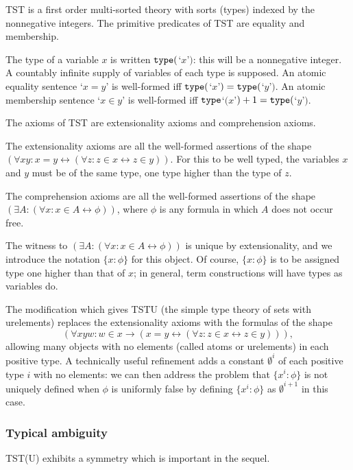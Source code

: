 \documentclass[112pt]{article}
\begin{document}
TST is a first order multi-sorted theory with sorts (types) indexed by the nonnegative integers.  The primitive predicates of TST are equality and membership.

The type of a variable $x$ is written ${\tt type}($`$x$'$)$:  this will be a nonnegative integer.   A countably infinite supply of variables of each type is supposed.  An atomic equality sentence `$x=y$' is well-formed iff ${\tt type}($`$x$'$)={\tt type}($`$y$'$)$.
An atomic membership sentence `$x \in y$' is well-formed iff ${\tt type}$`$(x$'$)+1 = {\tt type}($`$y$'$)$.

The axioms of TST are extensionality axioms and comprehension axioms.

The extensionality axioms are all the well-formed assertions of the shape $(\forall xy:x=y \leftrightarrow (\forall z:z \in x \leftrightarrow z\in y))$.  For this to be well typed, the variables
$x$ and $y$ must be of the same type, one type higher than the type of $z$.

The comprehension axioms are all the well-formed assertions of the shape $(\exists A:(\forall x:x \in A \leftrightarrow \phi))$, where $\phi$ is any formula in which $A$ does not occur free.

The witness to $(\exists A:(\forall x:x \in A \leftrightarrow \phi))$ is unique by extensionality, and we introduce the notation $\{x:\phi\}$ for this object.  Of course, $\{x:\phi\}$  is to be assigned type one higher than that of $x$;  in general, term constructions will have types as variables do.

The modification which gives TSTU (the simple type theory of sets with urelements) replaces the extensionality axioms with the formulas of the shape $$(\forall xyw:w \in x \rightarrow (x=y \leftrightarrow (\forall z:z \in x \leftrightarrow z\in y))),$$  allowing many objects with no elements (called atoms or urelements)  in each positive type.  A technically useful refinement adds a constant $\emptyset^i$ of each positive type $i$ with no elements:  we can then address the problem that $\{x^i:\phi\}$ is not uniquely defined when $\phi$ is uniformly false by defining $\{x^i:\phi\}$ as $\emptyset^{i+1}$ in this case.

\subsubsection{Typical ambiguity}

TST(U) exhibits a symmetry which is important in the sequel.
\end{document}
